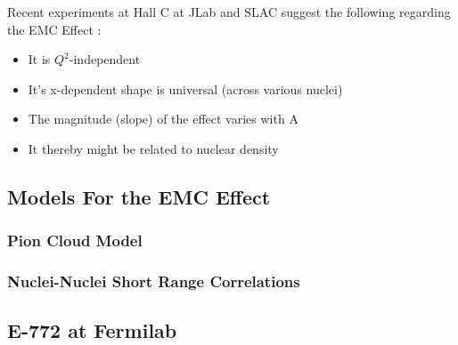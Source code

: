Recent experiments at Hall C at JLab and SLAC suggest the following regarding the EMC Effect \cite{Seely:2009gt}:
\begin{itemize}
	\item
	It is $Q^2$-independent
	\item
	It's x-dependent shape is universal (across various nuclei)
	\item
	The magnitude (slope) of the effect varies with A
	\item
	It thereby might be related to nuclear density
\end{itemize}
%

\subsection{Models For the EMC Effect}

\subsubsection{Pion Cloud Model}

\subsubsection{Nuclei-Nuclei Short Range Correlations}

\subsection{E-772 at Fermilab}

